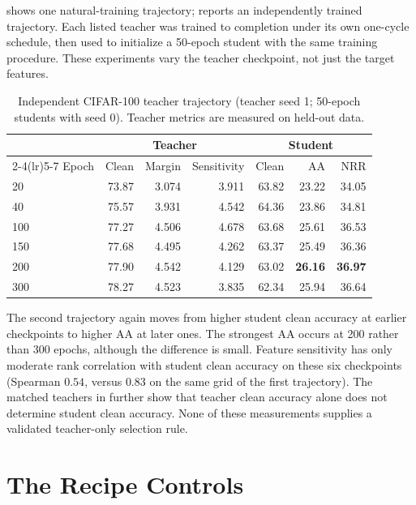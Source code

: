 \documentclass{article} %
\theoremstyle{plain}
\begin{document}
 shows one natural-training trajectory; 
reports an independently trained trajectory. Each listed teacher was trained to completion under
its own one-cycle schedule, then used to initialize a 50-epoch student with the same training
procedure. These experiments vary the teacher checkpoint, not just the target features.

\begin{table}[!htbp]
  \centering \small \setlength{\tabcolsep}{4pt}
  \caption{Independent CIFAR-100 teacher trajectory (teacher seed 1; 50-epoch students with
  seed 0). Teacher metrics are measured on held-out data.}
  \label{tab:teacherladder_seed1}
  \begin{tabular}{lrrrrrr}
    \toprule
    & \multicolumn{3}{c}{Teacher} & \multicolumn{3}{c}{Student} \\
    \cmidrule(lr){2-4}\cmidrule(lr){5-7}
    Epoch & Clean & Margin & Sensitivity & Clean & AA & NRR \\
    \midrule
    20       & 73.87 & 3.074 & 3.911 & 63.82 & 23.22 & 34.05 \\
    40       & 75.57 & 3.931 & 4.542 & 64.36 & 23.86 & 34.81 \\
    100      & 77.27 & 4.506 & 4.678 & 63.68 & 25.61 & 36.53 \\
    150      & 77.68 & 4.495 & 4.262 & 63.37 & 25.49 & 36.36 \\
    200      & 77.90 & 4.542 & 4.129 & 63.02 & \textbf{26.16} & \textbf{36.97} \\
    300      & 78.27 & 4.523 & 3.835 & 62.34 & 25.94 & 36.64 \\
    \bottomrule
  \end{tabular}
\end{table}

The second trajectory again moves from higher student clean accuracy at earlier checkpoints to
higher AA at later ones. The strongest AA occurs at 200 rather than 300 epochs, although the
difference is small. Feature sensitivity has only moderate rank correlation with student clean
accuracy on these six checkpoints (Spearman $0.54$, versus $0.83$ on the same grid of the first
trajectory). The matched teachers in  further show that teacher clean
accuracy alone does not determine student clean accuracy. None of these measurements supplies a
validated teacher-only selection rule.

\section{The Recipe Controls}
\label{app:recipe}
\end{document}
